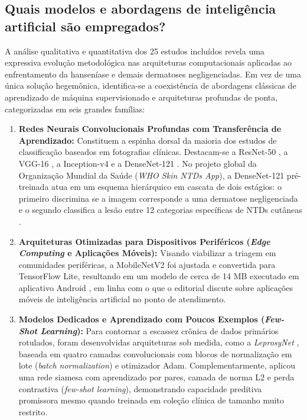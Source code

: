 \subsection{Quais modelos e abordagens de inteligência artificial são empregados?}

A análise qualitativa e quantitativa dos 25 estudos incluídos revela uma expressiva evolução metodológica nas arquiteturas computacionais aplicadas ao enfrentamento da hanseníase e demais dermatoses negligenciadas. Em vez de uma única solução hegemônica, identifica-se a coexistência de abordagens clássicas de aprendizado de máquina supervisionado e arquiteturas profundas de ponta, categorizadas em seis grandes famílias:

\begin{enumerate}
    \item \textbf{Redes Neurais Convolucionais Profundas com Transferência de Aprendizado:} Constituem a espinha dorsal da maioria dos estudos de classificação baseados em fotografias clínicas. Destacam-se a ResNet-50 , a VGG-16 , a Inception-v4  e a DenseNet-121 . No projeto global da Organização Mundial da Saúde (\textit{WHO Skin NTDs App}), a DenseNet-121 pré-treinada atua em um esquema hierárquico em cascata de dois estágios: o primeiro discrimina se a imagem corresponde a uma dermatose negligenciada e o segundo classifica a lesão entre 12 categorias específicas de NTDs cutâneas .

    \item \textbf{Arquiteturas Otimizadas para Dispositivos Periféricos (\textit{Edge Computing} e Aplicações Móveis):} Visando viabilizar a triagem em comunidades periféricas, a MobileNetV2 foi ajustada e convertida para TensorFlow Lite, resultando em um modelo de cerca de 14 MB executado em aplicativo Android , em linha com o que o editorial  discute sobre aplicações móveis de inteligência artificial no ponto de atendimento.

    \item \textbf{Modelos Dedicados e Aprendizado com Poucos Exemplos (\textit{Few-Shot Learning}):} Para contornar a escassez crônica de dados primários rotulados, foram desenvolvidas arquiteturas sob medida, como a \textit{LeprosyNet} , baseada em quatro camadas convolucionais com blocos de normalização em lote (\textit{batch normalization}) e otimizador Adam. Complementarmente,  aplicou uma rede siamesa com aprendizado por pares, camada de norma L2 e perda contrastiva (\textit{few-shot learning}), demonstrando capacidade preditiva promissora mesmo quando treinada em coleção clínica de tamanho muito restrito.


\end{enumerate}

